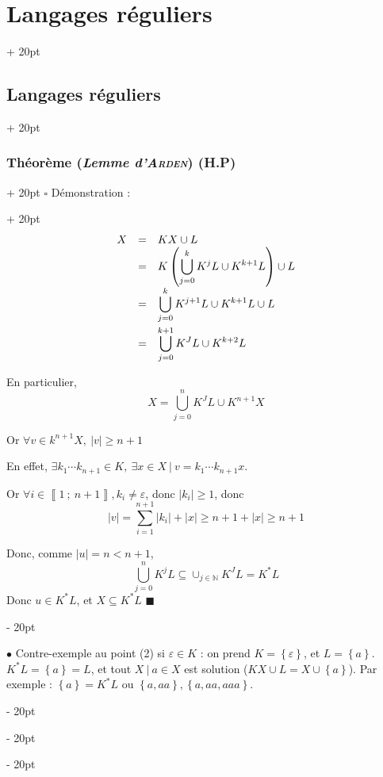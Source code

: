 \documentclass[a4paper, 12pt, twoside]{article}
\newcommand{\N}{\mathbb{N}} %
\newcommand{\nset}[2]{\left\llbracket #1\ ;\ #2 \right\rrbracket}
\newcommand{\lr}[1]{\left( #1 \right)}
\newcommand{\set}[1]{\left\{ #1 \right\}}
\newcommand{\abs}[1]{\left\lvert #1 \right\rvert}
\renewcommand{\ge}{\geqslant}
\newcommand{\ind}[1][20pt]{\advance\leftskip + #1}
\newcommand{\deind}[1][20pt]{\advance\leftskip - #1}
\newenvironment{indt}[2][20pt]{#2 \par \ind[#1]}{\par \deind} %
\newenvironment{proof}[1][{Démonstration :}]{\begin{indt}{$\square$ #1}}{$\blacksquare$ \end{indt}}
\begin{document}
\begin{indt}{\section{Langages réguliers}}
\begin{indt}{\subsection{Langages réguliers}}
\begin{indt}{\subsubsection{Théorème (\textit{Lemme d'\textsc{Arden}}) (H.P)}}
\begin{proof}
                    \[
                        \begin{array}{rcl}
                            X
                            &=& KX \cup L
                            \\
                            &=& \displaystyle K\lr{\bigcup_{j = 0}^k K^j L \cup K^{k + 1}L} \cup L
                            \\
                            &=& \displaystyle \bigcup_{j = 0}^k K^{j + 1} L \cup K^{k + 1} L \cup L
                            \vspace{3pt}
                            \\
                            &=& \displaystyle \bigcup_{j = 0}^{k + 1} K^J L \cup K^{k + 2} L
                        \end{array}
                    \]

                    En particulier,
                    \[
                        X = \bigcup_{j = 0}^n K^J L \cup K^{n + 1} X
                    \]

                    Or $\forall v \in k^{n + 1}X,\ \abs v \ge n + 1$

                    En effet, $\exists k_1 \cdots k_{n + 1} \in K,\ \exists x \in X\ |\ v = k_1 \cdots k_{n + 1} x$.

                    Or $\forall i \in \nset 1 {n + 1}, k_i \neq \varepsilon$, donc $\abs{k_i} \ge 1$, donc
                    \[
                        \abs v = \sum_{i = 1}^{n + 1} \abs{k_i} + \abs x
                        \ge n + 1 + \abs x \ge n + 1
                    \]

                    Donc, comme $\abs u = n < n + 1$,
                    \[
                        \bigcup_{j = 0}^n K^j L \subseteq \cup_{j \in \N} K^J L = K^*L
                    \]
                    Donc $u \in K^* L$, et $X \subseteq K^*L$
                \end{proof}

                \vspace{12pt}
                
                $\bullet$ Contre-exemple au point (2) si $\varepsilon \in K$ : on prend $K = \set \varepsilon$, et $L = \set a$.
                $K^*L = \set a = L$, et tout $X\ |\ a \in X$ est solution ($KX\cup L = X \cup \set a$). Par exemple : $\set a = K^*L$ ou $\set{a, aa}, \set{a, aa, aaa}$.
            \end{indt}

            \vspace{12pt}
            

\end{indt}
\end{indt}
\end{document}
